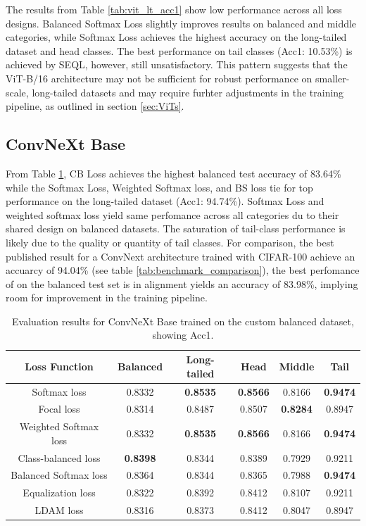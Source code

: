 The results from Table \ref{tab:vit_lt_acc1} show low performance across all loss designs. Balanced Softmax Loss slightly improves results on balanced and middle categories, while Softmax Loss achieves the highest accuracy on the long-tailed dataset and head classes. The best performance on tail classes (Acc1: 10.53\%) is achieved by SEQL, however, still unsatisfactory. This pattern suggests that the ViT-B/16 architecture may not be sufficient for robust performance on smaller-scale, long-tailed datasets and may require furhter adjustments in the training pipeline, as outlined in section \ref{sec:ViTs}. 

\subsection{ConvNeXt Base}
From Table \ref{tab:conv_bal_acc1_1}, CB Loss achieves the highest balanced test accuracy of 83.64\% while the Softmax Loss, Weighted Softmax loss, and BS loss tie for top performance on the long-tailed dataset (Acc1: 94.74\%). Softmax Loss and weighted softmax loss yield same perfomance across all categories du to their shared design on balanced datasets. The saturation of tail-class performance is likely due to the quality or quantity of tail classes. For comparison, the best published result for a ConvNext architecture trained with CIFAR-100 achieve an accuarcy of 94.04\% (see table \ref{tab:benchmark_comparison}), the best perfomance of on the balanced test set is in alignment yields an accuracy of 83.98\%, implying room for improvement in the training pipeline.

\begin{table}[h!]
    \centering
    \caption{Evaluation results for ConvNeXt Base trained on the custom balanced dataset, showing Acc1.}
    \small
    \begin{tabular}{cccccc}
        \toprule
        Loss Function & Balanced & Long-tailed & Head & Middle & Tail \\ 
        \midrule
        Softmax loss   & 0.8332 & \textbf{0.8535} & \textbf{0.8566} & 0.8166 & \textbf{0.9474} \\
        Focal loss   & 0.8314 & 0.8487 & 0.8507 & \textbf{0.8284} & 0.8947 \\
        Weighted Softmax loss   & 0.8332 & \textbf{0.8535} & \textbf{0.8566} &  0.8166 & \textbf{0.9474} \\
        Class-balanced loss   & \textbf{0.8398} & 0.8344 & 0.8389 & 0.7929 & 0.9211 \\
        Balanced Softmax loss   & 0.8364 & 0.8344 & 0.8365 & 0.7988 & \textbf{0.9474} \\
        Equalization loss   & 0.8322 & 0.8392 & 0.8412 & 0.8107 & 0.9211 \\
        LDAM loss   & 0.8316 & 0.8373 & 0.8412 & 0.8047 & 0.8947 \\
        \bottomrule
    \end{tabular}
    \label{tab:conv_bal_acc1_1}
\end{table}


